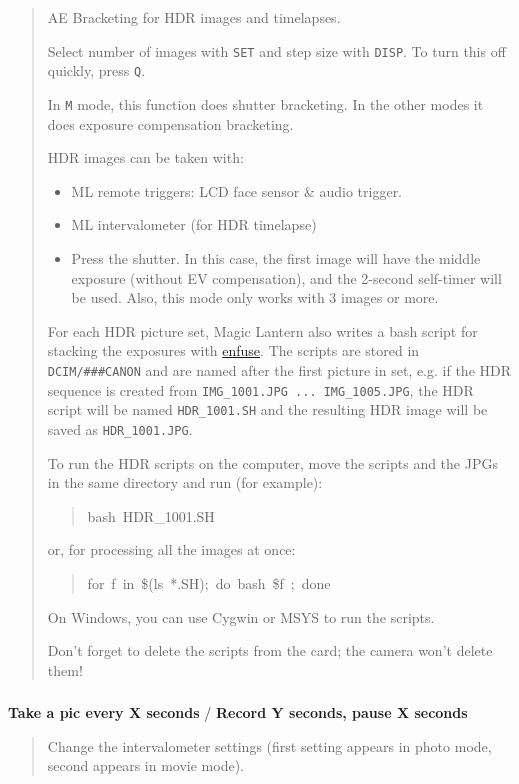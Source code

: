 \documentclass[a4paper,english]{article}
\begin{document}
\begin{quote}

AE Bracketing for HDR images and timelapses.

Select number of images with \texttt{SET} and step size with \texttt{DISP}. To turn this off quickly, press \texttt{Q}.

In \texttt{M} mode, this function does shutter bracketing. In the other modes it does exposure compensation bracketing.

HDR images can be taken with:
%
\begin{itemize}

\item ML remote triggers: LCD face sensor \& audio trigger.

\item ML intervalometer (for HDR timelapse)

\item Press the shutter. In this case, the first image will have the middle exposure (without EV compensation), and the 2-second self-timer will be used. Also, this mode only works with 3 images or more.

\end{itemize}

For each HDR picture set, Magic Lantern also writes a bash script for stacking the exposures
with \href{http://wiki.panotools.org/Enfuse}{enfuse}. The scripts are stored in \texttt{DCIM/\#\#\#CANON} and are named after the first picture in set,
e.g. if the HDR sequence is created from \texttt{IMG\_1001.JPG ... IMG\_1005.JPG}, the HDR script will be named
\texttt{HDR\_1001.SH} and the resulting HDR image will be saved as \texttt{HDR\_1001.JPG}.

To run the HDR scripts on the computer, move the scripts and the JPGs in the same directory and run (for example):
%
\begin{quote}{\ttfamily \raggedright \noindent
bash~HDR\_1001.SH
}
\end{quote}

or, for processing all the images at once:
%
\begin{quote}{\ttfamily \raggedright \noindent
for~f~in~\$(ls~*.SH);~do~bash~\$f~;~done
}
\end{quote}

On Windows, you can use Cygwin or MSYS to run the scripts.

Don't forget to delete the scripts from the card; the camera won't delete them!

\end{quote}
\vspace{-10mm}\subsubsection*{}\label{intervalometer}
\textbf{Take a pic every X seconds} / \textbf{Record Y seconds, pause X seconds}
%
\begin{quote}

Change the intervalometer settings (first setting appears in photo mode, second appears in movie mode).

\end{quote}
\end{document}
